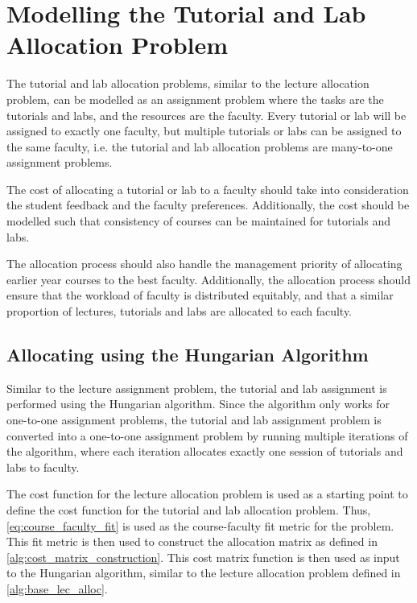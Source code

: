 \section{Modelling the Tutorial and Lab Allocation Problem}

The tutorial and lab allocation problems, similar to the lecture allocation problem, can be modelled as an assignment problem where the tasks are the tutorials and labs, and the resources are the faculty. Every tutorial or lab will be assigned to exactly one faculty, but multiple tutorials or labs can be assigned to the same faculty, i.e. the tutorial and lab allocation problems are many-to-one assignment problems.

The cost of allocating a tutorial or lab to a faculty should take into consideration the student feedback and the faculty preferences. Additionally, the cost should be modelled such that consistency of courses can be maintained for tutorials and labs.

The allocation process should also handle the management priority of allocating earlier year courses to the best faculty. Additionally, the allocation process should ensure that the workload of faculty is distributed equitably, and that a similar proportion of lectures, tutorials and labs are allocated to each faculty.

\subsection{Allocating using the Hungarian Algorithm}

Similar to the lecture assignment problem, the tutorial and lab assignment is performed using the Hungarian algorithm. Since the algorithm only works for one-to-one assignment problems, the tutorial and lab assignment problem is converted into a one-to-one assignment problem by running multiple iterations of the algorithm, where each iteration allocates exactly one session of tutorials and labs to faculty.

The cost function for the lecture allocation problem is used as a starting point to define the cost function for the tutorial and lab allocation problem. Thus, \autoref{eq:course_faculty_fit} is used as the course-faculty fit metric for the problem. This fit metric is then used to construct the allocation matrix as defined in \autoref{alg:cost_matrix_construction}. This cost matrix function is then used as input to the Hungarian algorithm, similar to the lecture allocation problem defined in \autoref{alg:base_lec_alloc}.


